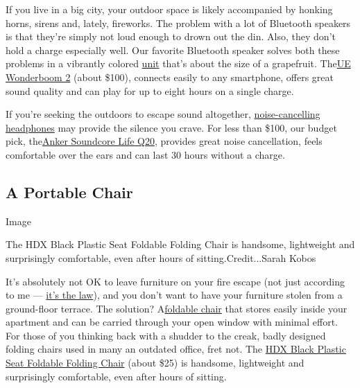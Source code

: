 If you live in a big city, your outdoor space is likely accompanied by
honking horns, sirens and, lately, fireworks. The problem with a lot of
Bluetooth speakers is that they're simply not loud enough to drown out
the din. Also, they don't hold a charge especially well. Our favorite
Bluetooth speaker solves both these problems in a vibrantly colored
\href{https://www.nytimes.com/wirecutter/reviews/best-bluetooth-speaker/?utm_source=nytimes\&utm_medium=referral\&utm_campaign=outdoor-space}{unit}
that's about the size of a grapefruit.
The\href{https://www.nytimes.com/wirecutter/reviews/best-bluetooth-speaker/?utm_source=nytimes\&utm_medium=referral\&utm_campaign=outdoor-space\#our-pick-ue-wonderboom-2}{UE
Wonderboom 2} (about \$100), connects easily to any smartphone, offers
great sound quality and can play for up to eight hours on a single
charge.

If you're seeking the outdoors to escape sound altogether,
\href{https://www.nytimes.com/wirecutter/reviews/best-noise-cancelling-headphones/?utm_source=nytimes\&utm_medium=referral\&utm_campaign=outdoor-space}{noise-cancelling
headphones} may provide the silence you crave. For less than \$100, our
budget pick,
the\href{https://www.nytimes.com/wirecutter/reviews/best-noise-cancelling-headphones/\#best-budget-over-ear-noise-cancelling-headphones-anker-soundcore-life-q20}{Anker
Soundcore Life Q20}, provides great noise cancellation, feels
comfortable over the ears and can last 30 hours without a charge.

\hypertarget{a-portable-chair}{%
\subsection{A Portable Chair}\label{a-portable-chair}}

Image

 The HDX Black Plastic Seat Foldable Folding Chair is handsome,
lightweight and surprisingly comfortable, even after hours of
sitting.Credit...Sarah Kobos

It's absolutely not OK to leave furniture on your fire escape (not just
according to me ---
\href{https://www.nytimes.com/2017/10/22/realestate/can-a-neighbor-keep-flowerpots-on-a-fire-escape.html}{it's
the law}), and you don't want to have your furniture stolen from a
ground-floor terrace. The solution?
A\href{https://www.nytimes.com/wirecutter/reviews/best-folding-chairs/?utm_source=nytimes\&utm_medium=referral\&utm_campaign=outdoor-space}{foldable
chair} that stores easily inside your apartment and can be carried
through your open window with minimal effort. For those of you thinking
back with a shudder to the creak, badly designed folding chairs used in
many an outdated office, fret not. The
\href{https://www.nytimes.com/wirecutter/reviews/best-folding-chairs/?utm_source=nytimes\&utm_medium=referral\&utm_campaign=outdoor-space\#our-pick-hdx-black-plastic-seat-foldable-folding-chair}{HDX
Black Plastic Seat Foldable Folding Chair} (about \$25) is handsome,
lightweight and surprisingly comfortable, even after hours of sitting.

